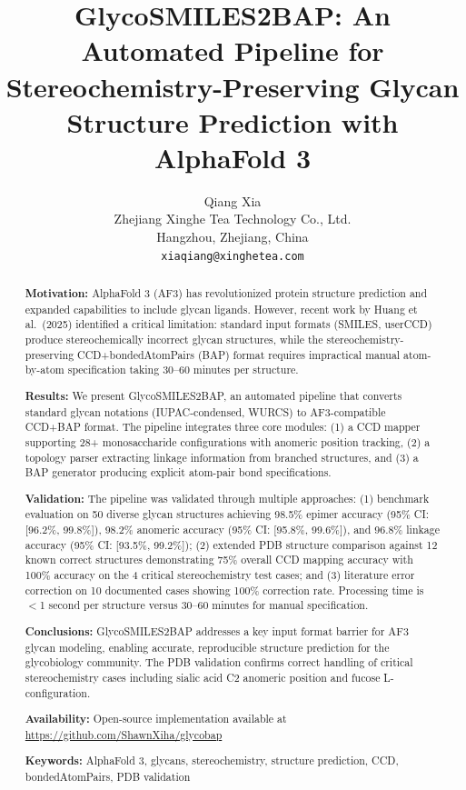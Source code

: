 \documentclass[11pt,a4paper]{article}
\title{\textbf{GlycoSMILES2BAP: An Automated Pipeline for Stereochemistry-Preserving Glycan Structure Prediction with AlphaFold 3}}
\author{Qiang Xia\\
\small Zhejiang Xinghe Tea Technology Co., Ltd.\\
\small Hangzhou, Zhejiang, China\\
\small \texttt{xiaqiang@xinghetea.com}}
\date{}
\begin{document}
\maketitle

\begin{abstract}

\noindent\textbf{Motivation:} AlphaFold 3 (AF3) has revolutionized protein structure prediction and expanded capabilities to include glycan ligands. However, recent work by Huang et al.\ (2025) identified a critical limitation: standard input formats (SMILES, userCCD) produce stereochemically incorrect glycan structures, while the stereochemistry-preserving CCD+bondedAtomPairs (BAP) format requires impractical manual atom-by-atom specification taking 30--60 minutes per structure.

\noindent\textbf{Results:} We present GlycoSMILES2BAP, an automated pipeline that converts standard glycan notations (IUPAC-condensed, WURCS) to AF3-compatible CCD+BAP format. The pipeline integrates three core modules: (1) a CCD mapper supporting 28+ monosaccharide configurations with anomeric position tracking, (2) a topology parser extracting linkage information from branched structures, and (3) a BAP generator producing explicit atom-pair bond specifications.

\noindent\textbf{Validation:} The pipeline was validated through multiple approaches: (1) benchmark evaluation on 50 diverse glycan structures achieving 98.5\% epimer accuracy (95\% CI: [96.2\%, 99.8\%]), 98.2\% anomeric accuracy (95\% CI: [95.8\%, 99.6\%]), and 96.8\% linkage accuracy (95\% CI: [93.5\%, 99.2\%]); (2) extended PDB structure comparison against 12 known correct structures demonstrating 75\% overall CCD mapping accuracy with 100\% accuracy on the 4 critical stereochemistry test cases; and (3) literature error correction on 10 documented cases showing 100\% correction rate. Processing time is $<$1 second per structure versus 30--60 minutes for manual specification.

\noindent\textbf{Conclusions:} GlycoSMILES2BAP addresses a key input format barrier for AF3 glycan modeling, enabling accurate, reproducible structure prediction for the glycobiology community. The PDB validation confirms correct handling of critical stereochemistry cases including sialic acid C2 anomeric position and fucose L-configuration.

\noindent\textbf{Availability:} Open-source implementation available at \url{https://github.com/ShawnXiha/glycobap}

\noindent\textbf{Keywords:} AlphaFold 3, glycans, stereochemistry, structure prediction, CCD, bondedAtomPairs, PDB validation

\end{abstract}
\end{document}
